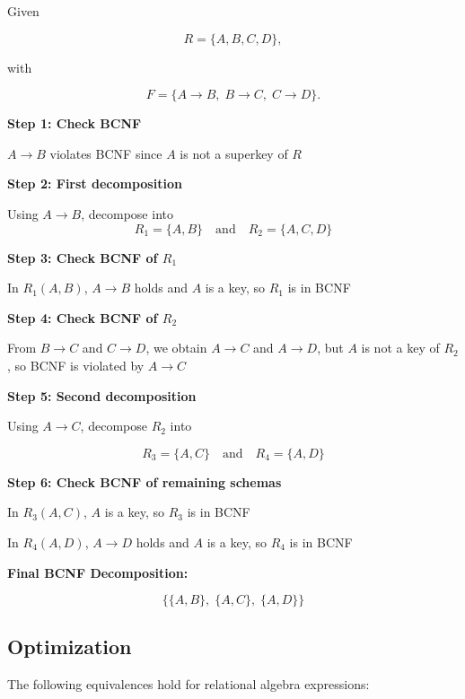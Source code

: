 Given

\[
    R = \{A, B, C, D\},
\]

with

\[
    F = \{ A \to B,\; B \to C,\; C \to D \}.
\]

\textbf{Step 1: Check BCNF}

\(A \to B\) violates BCNF since \(A\) is not a superkey of \(R\)

\textbf{Step 2: First decomposition}

Using \(A \to B\), decompose into
\[
    R_1 = \{A, B\}
    \quad\text{and}\quad
    R_2 = \{A, C, D\}
\]

\textbf{Step 3: Check BCNF of \(R_1\)}

In \(R_1(A,B)\), \(A \to B\) holds and \(A\) is a key, so \(R_1\) is in BCNF

\textbf{Step 4: Check BCNF of \(R_2\)}

From \(B \to C\) and \(C \to D\), we obtain \(A \to C\) and \(A \to D\), but \(A\) is not a key of \(R_2\), so BCNF is violated by \(A \to C\)

\textbf{Step 5: Second decomposition}

Using \(A \to C\), decompose \(R_2\) into

\[
    R_3 = \{A, C\}
    \quad\text{and}\quad
    R_4 = \{A, D\}
\]

\textbf{Step 6: Check BCNF of remaining schemas}

In \(R_3(A,C)\), \(A\) is a key, so \(R_3\) is in BCNF

In \(R_4(A,D)\), \(A \to D\) holds and \(A\) is a key, so \(R_4\) is in BCNF

\textbf{Final BCNF Decomposition:}

\[
    \{ \{A,B\},\; \{A,C\},\; \{A,D\} \}
\]

\subsection{Optimization}

The following equivalences hold for relational algebra expressions: 

